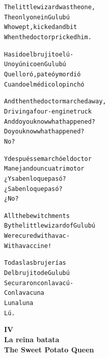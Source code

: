 \documentclass[11pt]{article}
\begin{document}
\begin{parcolumns}{2}
\colplacechunks

\colchunk
{
\begin{alltt}\normalfont
The little wizard was the one,
The only one in Gulubú
Who wept, kicked and bit
When the doctor pricked him.
\end{alltt}
}

\colchunk
{
\begin{alltt}\normalfont
Ha sido el brujito el ú-
Uno y único en Gulubú
Que lloró, pateó y mordió
Cuando el médico lo pinchó
\end{alltt}
}

\colplacechunks

\colchunk
{
\begin{alltt}\normalfont
And then the doctor marched away,
Driving a four-engine truck
And do you know what happened?
Do you know what happened?
No?
\end{alltt}
}

\colchunk
{
\begin{alltt}\normalfont
Y después se marchó el doctor
Manejando un cuatrimotor
¿Y saben lo que pasó?
¿Saben lo que pasó?
¿No?
\end{alltt}
}

\colplacechunks

\colchunk
{
\begin{alltt}\normalfont
All the bewitchments
By the little wizard of Gulubú
Were cured with a vac-
With a vaccine!
\end{alltt}
}

\colchunk
{
\begin{alltt}\normalfont
Todas las brujerías
Del brujito de Gulubú
Se curaron con la vacú-
Con la vacuna
Luna luna
Lú.
\end{alltt}
}

\colplacechunks

\end{parcolumns}

\clearpage

\begin{center}
\large\textbf{
IV\\
La reina batata\\
The Sweet Potato Queen
}
\end{center}
\end{document}
